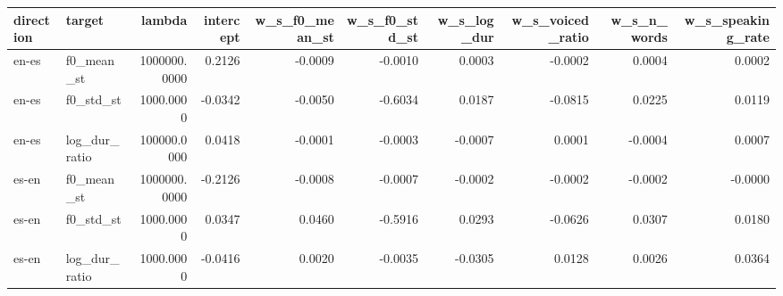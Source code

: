 \begin{tabular}{llrrrrrrrr}
\toprule
direction & target & lambda & intercept & w_s_f0_mean_st & w_s_f0_std_st & w_s_log_dur & w_s_voiced_ratio & w_s_n_words & w_s_speaking_rate \\
\midrule
en-es & f0_mean_st & 1000000.0000 & 0.2126 & -0.0009 & -0.0010 & 0.0003 & -0.0002 & 0.0004 & 0.0002 \\
en-es & f0_std_st & 1000.0000 & -0.0342 & -0.0050 & -0.6034 & 0.0187 & -0.0815 & 0.0225 & 0.0119 \\
en-es & log_dur_ratio & 100000.0000 & 0.0418 & -0.0001 & -0.0003 & -0.0007 & 0.0001 & -0.0004 & 0.0007 \\
es-en & f0_mean_st & 1000000.0000 & -0.2126 & -0.0008 & -0.0007 & -0.0002 & -0.0002 & -0.0002 & -0.0000 \\
es-en & f0_std_st & 1000.0000 & 0.0347 & 0.0460 & -0.5916 & 0.0293 & -0.0626 & 0.0307 & 0.0180 \\
es-en & log_dur_ratio & 1000.0000 & -0.0416 & 0.0020 & -0.0035 & -0.0305 & 0.0128 & 0.0026 & 0.0364 \\
\bottomrule
\end{tabular}
